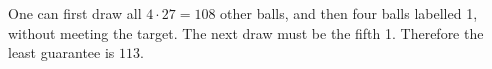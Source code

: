 One can first draw all $4\cdot27=108$ other balls, and then four balls labelled 1, without meeting the target. The next draw must be the fifth 1. Therefore the least guarantee is $\boxed{113}$.

